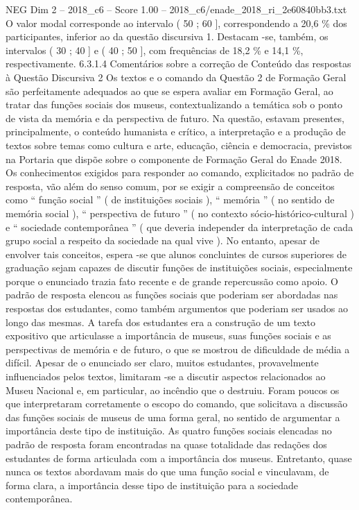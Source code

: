 \begin{textsample}{NEG Dim 2 – 2018\_c6 – Score 1.00 – 2018\_c6/enade\_2018\_ri\_2e60840bb3.txt}
O valor modal corresponde ao intervalo ( 50 ; 60 ], correspondendo a 20,6 \% dos participantes, inferior ao da questão discursiva 1.
Destacam -se, também, os intervalos ( 30 ; 40 ] e ( 40 ; 50 ], com frequências de 18,2 \% e 14,1 \%, respectivamente. 6.3.1.4 Comentários sobre a correção de Conteúdo das respostas à Questão Discursiva 2 Os textos e o comando da Questão 2 de Formação Geral são perfeitamente adequados ao que se espera avaliar em Formação Geral, ao tratar das funções sociais dos museus, contextualizando a temática sob o ponto de vista da memória e da perspectiva de futuro.
Na questão, estavam presentes, principalmente, o conteúdo humanista e crítico, a interpretação e a produção de textos sobre temas como cultura e arte, educação, ciência e democracia, previstos na Portaria que dispõe sobre o componente de Formação Geral do Enade 2018.
Os conhecimentos exigidos para responder ao comando, explicitados no padrão de resposta, vão além do senso comum, por se exigir a compreensão de conceitos como “ função social ” ( de instituições sociais ), “ memória ” ( no sentido de memória social ), “ perspectiva de futuro ” ( no contexto sócio-histórico-cultural ) e “ sociedade contemporânea ” ( que deveria independer da interpretação de cada grupo social a respeito da sociedade na qual vive ).
No entanto, apesar de envolver tais conceitos, espera -se que alunos concluintes de cursos superiores de graduação sejam capazes de discutir funções de instituições sociais, especialmente porque o enunciado trazia fato recente e de grande repercussão como apoio.
O padrão de resposta elencou as funções sociais que poderiam ser abordadas nas respostas dos estudantes, como também argumentos que poderiam ser usados ao longo das mesmas.
A tarefa dos estudantes era a construção de um texto expositivo que articulasse a importância de museus, suas funções sociais e as perspectivas de memória e de futuro, o que se mostrou de dificuldade de média a difícil.
Apesar de o enunciado ser claro, muitos estudantes, provavelmente influenciados pelos textos, limitaram -se a discutir aspectos relacionados ao Museu Nacional e, em particular, ao incêndio que o destruiu.
Foram poucos os que interpretaram corretamente o escopo do comando, que solicitava a discussão das funções sociais de museus de uma forma geral, no sentido de argumentar a importância deste tipo de instituição.
As quatro funções sociais elencadas no padrão de resposta foram encontradas na quase totalidade das redações dos estudantes de forma articulada com a importância dos museus.
Entretanto, quase nunca os textos abordavam mais do que uma função social e vinculavam, de forma clara, a importância desse tipo de instituição para a sociedade contemporânea.

\end{textsample}
